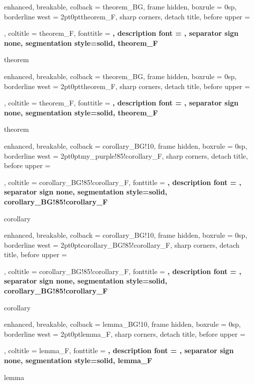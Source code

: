 \makeatletter
{
	enhanced,
	breakable,
	colback = theorem_BG,
	frame hidden,
	boxrule = 0sp,
	borderline west = {2pt}{0pt}{theorem_F},
	sharp corners,
	detach title,
	before upper = \tcbtitle\par\smallskip,
	coltitle = theorem_F,
	fonttitle = \bfseries\sffamily,
	description font = \mdseries,
	separator sign none,
	segmentation style={solid, theorem_F}
}
{theorem}

{
	enhanced,
	breakable,
	colback = theorem_BG,
	frame hidden,
	boxrule = 0sp,
	borderline west = {2pt}{0pt}{theorem_F},
	sharp corners,
	detach title,
	before upper = \tcbtitle\par\smallskip,
	coltitle = theorem_F,
	fonttitle = \bfseries\sffamily,
	description font = \mdseries,
	separator sign none,
	segmentation style={solid, theorem_F}
}
{theorem}

{
	enhanced,
	breakable,
	colback = corollary_BG!10,
	frame hidden,
	boxrule = 0sp,
	borderline west = {2pt}{0pt}{my_purple!85!corollary_F},
	sharp corners,
	detach title,
	before upper = \tcbtitle\par\smallskip,
	coltitle = corollary_BG!85!corollary_F,
	fonttitle = \bfseries\sffamily,
	description font = \mdseries,
	separator sign none,
	segmentation style={solid, corollary_BG!85!corollary_F}
}
{corollary}

{
	enhanced,
	breakable,
	colback = corollary_BG!10,
	frame hidden,
	boxrule = 0sp,
	borderline west = {2pt}{0pt}{corollary_BG!85!corollary_F},
	sharp corners,
	detach title,
	before upper = \tcbtitle\par\smallskip,
	coltitle = corollary_BG!85!corollary_F,
	fonttitle = \bfseries\sffamily,
	description font = \mdseries,
	separator sign none,
	segmentation style={solid, corollary_BG!85!corollary_F}
}
{corollary}

{
	enhanced,
	breakable,
	colback = lemma_BG!10,
	frame hidden,
	boxrule = 0sp,
	borderline west = {2pt}{0pt}{lemma_F},
	sharp corners,
	detach title,
	before upper = \tcbtitle\par\smallskip,
	coltitle = lemma_F,
	fonttitle = \bfseries\sffamily,
	description font = \mdseries,
	separator sign none,
	segmentation style={solid, lemma_F}
}
{lemma}

